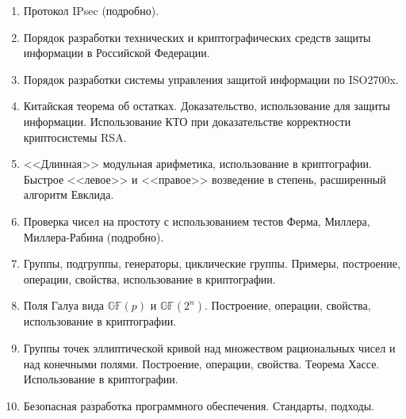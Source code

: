 \begin{enumerate}
    \item Протокол IPsec (подробно).
    \item Порядок разработки технических и криптографических средств защиты информации в Российской Федерации.
    \item Порядок разработки системы управления защитой информации по ISO2700x.
    \item Китайская теорема об остатках. Доказательство, использование для защиты информации. Использование КТО при доказательстве корректности криптосистемы RSA.
    \item <<Длинная>> модульная арифметика, использование в криптографии. Быстрое <<левое>> и <<правое>> возведение в степень, расширенный алгоритм Евклида.
    \item Проверка чисел на простоту с использованием тестов Ферма, Миллера, Миллера-Рабина (подробно).
    \item Группы, подгруппы, генераторы, циклические группы. Примеры, построение, операции, свойства, использование в криптографии.
    \item Поля Галуа вида $\mathbb{GF}(p)$ и $\mathbb{GF}(2^n)$. Построение, операции, свойства, использование в криптографии.
    \item Группы точек эллиптической кривой над множеством рациональных чисел и над конечными полями. Построение, операции, свойства. Теорема Хассе. Использование в криптографии.
    \item Безопасная разработка программного обеспечения. Стандарты, подходы.
\end{enumerate}
